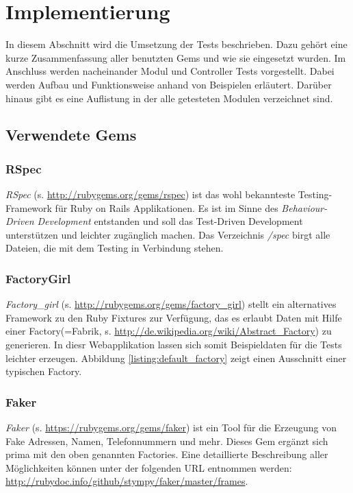 \documentclass[12pt,             %
               a4paper,          %
               listof=totoc,     %
               index=totoc,      %
               bibliography=totoc,%
               oneside,         %
               BCOR1cm,          %
               english   %
               ]{scrbook}
\begin{document}
\section{Implementierung}
In diesem Abschnitt wird die Umsetzung der Tests beschrieben. Dazu gehört eine kurze Zusammenfassung aller benutzten Gems und wie sie eingesetzt wurden. Im Anschluss werden nacheinander Modul und Controller Tests vorgestellt. Dabei werden Aufbau und Funktionsweise anhand von Beispielen erläutert. Darüber hinaus gibt es eine Auflistung in der alle getesteten Modulen verzeichnet sind.
\subsection{Verwendete Gems}
\subsubsection{RSpec}
\textit{RSpec} (s. \url{http://rubygems.org/gems/rspec}) ist das wohl bekannteste Testing-Framework für Ruby on Rails Applikationen. Es ist im Sinne des \textit{Behaviour-Driven Development} entstanden und soll das Test-Driven Development unterstützen und leichter zugänglich machen. Das Verzeichnis \textit{/spec} birgt alle Dateien, die mit dem Testing in Verbindung stehen.

\subsubsection{FactoryGirl}
\textit{Factory\_girl} (s. \url{http://rubygems.org/gems/factory_girl}) stellt ein alternatives Framework zu den Ruby Fixtures zur Verfügung, das es erlaubt Daten mit Hilfe einer \glqq Factory\grqq (=Fabrik, s. \url{http://de.wikipedia.org/wiki/Abstract_Factory}) zu generieren. In diesr Webapplikation lassen sich somit Beispieldaten für die Tests leichter erzeugen. Abbildung \vref{listing:default_factory} zeigt einen Ausschnitt einer typischen Factory.  

\label{listing:default_factory}

\subsubsection{Faker}
\textit{Faker} (s. \url{https://rubygems.org/gems/faker}) ist ein Tool für die Erzeugung von Fake Adressen, Namen, Telefonnummern und mehr. Dieses Gem ergänzt sich prima mit den oben genannten Factories. Eine detaillierte Beschreibung aller Möglichkeiten können unter der folgenden URL entnommen werden: \url{http://rubydoc.info/github/stympy/faker/master/frames}.
\end{document}

